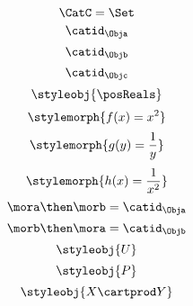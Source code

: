 {\begin{forslides}
        \begin{equation}
            \label{eq:23}
            \CatC = \Set
        \end{equation}
        \begin{equation}
            \label{eq:24}
            \catid_{\Obja}
        \end{equation}
        \begin{equation}
            \label{eq:25}
            \catid_{\Objb}
        \end{equation}
        \begin{equation}
            \label{eq:26}
            \catid_{\Objc}
        \end{equation}
        \begin{equation}
            \label{eq:27}
            \styleobj{\posReals}
        \end{equation}
        \begin{equation}
            \label{eq:28}
            \stylemorph{f(x) = x^2}
        \end{equation}
        \begin{equation}
            \label{eq:29}
            \stylemorph{g(y) = \frac{1}{y}}
        \end{equation}
        \begin{equation}
            \label{eq:30}
            \stylemorph{h(x) = \frac{1}{x^2}}
        \end{equation}
        \begin{equation}
            \label{eq:31}
            \mora \then \morb = \catid_\Obja
        \end{equation}
        \begin{equation}
            \label{eq:32}
            \morb \then \mora = \catid_\Objb
        \end{equation}
        \begin{equation}
            \label{eq:33}
            \styleobj{U}
        \end{equation}
        \begin{equation}
            \label{eq:34}
            \styleobj{P}
        \end{equation}
        \begin{equation}
            \label{eq:35}
            \styleobj{X \cartprod Y}
        \end{equation}
        \begin{equation}

\end{equation}
\end{forslides}}
